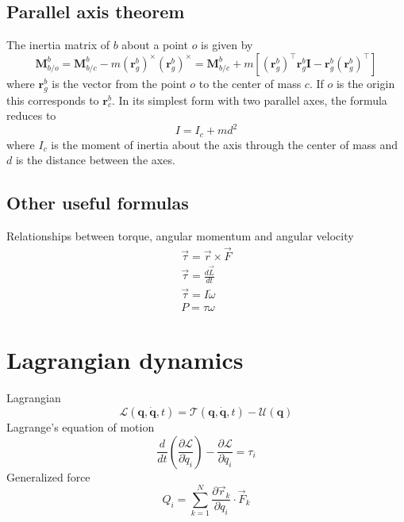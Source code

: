 \subsection{Parallel axis theorem}
The inertia matrix of $b$ about a point $o$ is given by
\begin{equation}
    \mathbf{M}_{b/o}^b = \mathbf{M}_{b/c}^b - m (\mathbf{r}_g^b)^\times (\mathbf{r}_g^b)^\times =
    \mathbf{M}_{b/c}^b + m\left[ (\mathbf{r}_g^b)^\top \mathbf{r}_g^b \mathbf{I} - \mathbf{r}_g^b (\mathbf{r}_g^b)^\top \right]
\end{equation}
where $\mathbf{r}_g^b$ is the vector from the point $o$ to the center of mass $c$. If $o$ is the origin this corresponds to $\mathbf{r}_c^b$. In its simplest form with two parallel axes, the formula reduces to
\begin{equation}
    I = I_c + md^2
\end{equation}
where $I_c$ is the moment of inertia about the axis through the center of mass and $d$ is the distance between the axes.

\subsection{Other useful formulas}
Relationships between torque, angular momentum and angular velocity
\begin{align}
    \vec{\tau} = \vec{r} \times \vec{F}\\
    \vec{\tau} = \frac{d\vec{L}}{dt}\\
    \vec{\tau} = I \dot{\omega}\\
    P = \tau \omega
\end{align}

\section{Lagrangian dynamics}
Lagrangian
\begin{equation}
    \mathcal{L}(\mathbf{q, \dot{q}}, t) = \mathcal{T}(\mathbf{q, \dot{q}}, t) - \mathcal{U}(\mathbf{q})
\end{equation}
Lagrange's equation of motion
\begin{equation}
    \frac{d}{dt} \left( \frac{\partial \mathcal{L}}{\partial \dot{q}_i} \right) - \frac{\partial \mathcal{L}}{\partial q_i} = \tau_i
\end{equation}
Generalized force
\begin{equation}
    Q_i = \sum_{k=1}^N \frac{\partial \vec{r}_k}{\partial q_i} \cdot \vec{F}_k
\end{equation}
